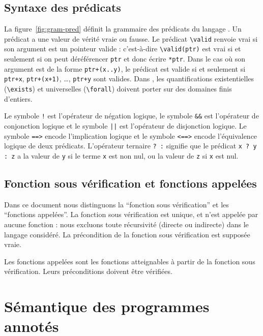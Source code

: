 \subsection{Syntaxe des prédicats \eacsl}
\label{sec:gram-pred}



La figure~\ref{fig:gram-pred} définit la grammaire des prédicats du langage
\eacsl.
Un prédicat a une valeur de vérité vraie ou fausse.
Le prédicat \lstinline'\valid' renvoie vrai si son argument est un pointeur
valide : c'est-à-dire \lstinline'\valid(ptr)' est vrai si et seulement si
on peut déréférencer \lstinline'ptr' et donc écrire \lstinline'*ptr'.
Dans le cas où son argument est de la forme \lstinline'ptr+(x..y)', le prédicat
est valide si et seulement si \lstinline'ptr+x', \lstinline'ptr+(x+1)', \ldots,
\lstinline'ptr+y' sont valides.
Dans \eacsl, les quantifications existentielles (\lstinline'\exists') et
universelles (\lstinline'\forall') doivent porter sur des domaines finis
d'entiers.

Le symbole \lstinline'!' est l'opérateur de négation logique, le symbole
\lstinline'&&' est l'opérateur de conjonction logique et le symbole
\lstinline'||' est l'opérateur de disjonction logique.
Le symbole \lstinline'==>' encode l'implication logique et le symbole
\lstinline'<==>' encode l'équivalence logique de deux prédicats.
L'opérateur ternaire \lstinline'? :' signifie que le prédicat
\lstinline'x ? y : z' a la valeur de \lstinline'y' si le terme \lstinline'x' est
non nul, ou la valeur de \lstinline'z' si \lstinline'x' est nul.

\subsection{Fonction sous vérification et fonctions appelées}

Dans ce document nous distinguons la ``fonction sous vérification'' et les
``fonctions appelées''.
La fonction sous vérification est unique, et n'est appelée par aucune fonction :
nous excluons toute récursivité (directe ou indirecte) dans le langage
considéré.
La précondition de la fonction sous vérification est supposée vraie.

Les fonctions appelées sont les fonctions atteignables à partir de la fonction
sous vérification.
Leurs préconditions doivent être vérifiées.


\section{Sémantique des programmes annotés}
\label{sec:lang-semantics}


